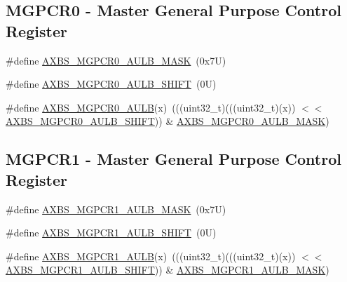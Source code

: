 \subsection*{M\+G\+P\+C\+R0 -\/ Master General Purpose Control Register}
\begin{DoxyCompactItemize}
\item 
\#define \mbox{\hyperlink{group___a_x_b_s___register___masks_ga161e38235a1d3154067e078e559202fd}{A\+X\+B\+S\+\_\+\+M\+G\+P\+C\+R0\+\_\+\+A\+U\+L\+B\+\_\+\+M\+A\+SK}}~(0x7\+U)
\item 
\#define \mbox{\hyperlink{group___a_x_b_s___register___masks_ga2c00c30d63906c765a6df81778e2fb4f}{A\+X\+B\+S\+\_\+\+M\+G\+P\+C\+R0\+\_\+\+A\+U\+L\+B\+\_\+\+S\+H\+I\+FT}}~(0\+U)
\item 
\#define \mbox{\hyperlink{group___a_x_b_s___register___masks_ga1a52b7004338c3caf87bc34f75bab14b}{A\+X\+B\+S\+\_\+\+M\+G\+P\+C\+R0\+\_\+\+A\+U\+LB}}(x)~(((uint32\+\_\+t)(((uint32\+\_\+t)(x)) $<$$<$ \mbox{\hyperlink{group___a_x_b_s___register___masks_ga2c00c30d63906c765a6df81778e2fb4f}{A\+X\+B\+S\+\_\+\+M\+G\+P\+C\+R0\+\_\+\+A\+U\+L\+B\+\_\+\+S\+H\+I\+FT}})) \& \mbox{\hyperlink{group___a_x_b_s___register___masks_ga161e38235a1d3154067e078e559202fd}{A\+X\+B\+S\+\_\+\+M\+G\+P\+C\+R0\+\_\+\+A\+U\+L\+B\+\_\+\+M\+A\+SK}})
\end{DoxyCompactItemize}
\subsection*{M\+G\+P\+C\+R1 -\/ Master General Purpose Control Register}
\begin{DoxyCompactItemize}
\item 
\#define \mbox{\hyperlink{group___a_x_b_s___register___masks_gaefd2ffd8d80f4eb9fd14f3c5a3a7b629}{A\+X\+B\+S\+\_\+\+M\+G\+P\+C\+R1\+\_\+\+A\+U\+L\+B\+\_\+\+M\+A\+SK}}~(0x7\+U)
\item 
\#define \mbox{\hyperlink{group___a_x_b_s___register___masks_gab45b6c2302bbf061fd1c43d436659bd7}{A\+X\+B\+S\+\_\+\+M\+G\+P\+C\+R1\+\_\+\+A\+U\+L\+B\+\_\+\+S\+H\+I\+FT}}~(0\+U)
\item 
\#define \mbox{\hyperlink{group___a_x_b_s___register___masks_ga80c64ff55917829c1d7c876966469c92}{A\+X\+B\+S\+\_\+\+M\+G\+P\+C\+R1\+\_\+\+A\+U\+LB}}(x)~(((uint32\+\_\+t)(((uint32\+\_\+t)(x)) $<$$<$ \mbox{\hyperlink{group___a_x_b_s___register___masks_gab45b6c2302bbf061fd1c43d436659bd7}{A\+X\+B\+S\+\_\+\+M\+G\+P\+C\+R1\+\_\+\+A\+U\+L\+B\+\_\+\+S\+H\+I\+FT}})) \& \mbox{\hyperlink{group___a_x_b_s___register___masks_gaefd2ffd8d80f4eb9fd14f3c5a3a7b629}{A\+X\+B\+S\+\_\+\+M\+G\+P\+C\+R1\+\_\+\+A\+U\+L\+B\+\_\+\+M\+A\+SK}})
\end{DoxyCompactItemize}
